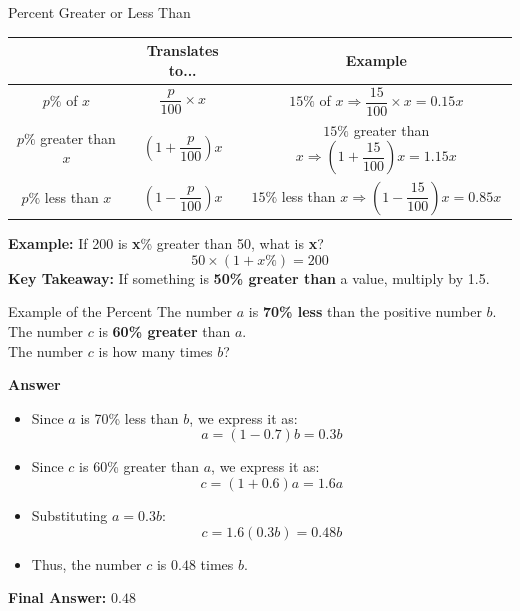 \documentclass{beamer}
\begin{document}
\begin{frame}{Percent Greater or Less Than}

\begin{table}[h]
    \centering
    \scriptsize %
    \renewcommand{\arraystretch}{1}
    \begin{tabular}{|c|c|c|}
        \hline
        & \textbf{Translates to...} & \textbf{Example} \\
        \hline
        $p\%$ of $x$ & $\dfrac{p}{100} \times x$ & $15\%$ of $x \Rightarrow \dfrac{15}{100} \times x = 0.15x$ \\
        \hline
        $p\%$ greater than $x$ & $\left(1 + \dfrac{p}{100} \right)x$ & $15\%$ greater than $x \Rightarrow \left(1 + \dfrac{15}{100} \right)x = 1.15x$ \\
        \hline
        $p\%$ less than $x$ & $\left(1 - \dfrac{p}{100} \right)x$ & $15\%$ less than $x \Rightarrow \left(1 - \dfrac{15}{100} \right)x = 0.85x$ \\
        \hline
    \end{tabular}
\end{table}


    \textbf{Example:} If 200 is \textbf{x}\% greater than 50, what is \textbf{x}?
    \[
   50\times(1+x\%)=200
    \]
    \textbf{Key Takeaway:} If something is \textbf{50\% greater than} a value, multiply by 1.5.
\end{frame}

\begin{frame}{{Example of the Percent}}
    The number \( a \) is \textbf{70\% less} than the positive number \( b \). \\
    The number \( c \) is \textbf{60\% greater} than \( a \). \\
    The number \( c \) is how many times \( b \)?
\end{frame}

\begin{frame}{\textbf{Answer}}
    \begin{itemize}
        \item Since \( a \) is 70\% less than \( b \), we express it as:
        \[
        a = (1 - 0.7)b = 0.3b
        \]
        \item Since \( c \) is 60\% greater than \( a \), we express it as:
        \[
        c = (1 + 0.6)a = 1.6a
        \]
        \item Substituting \( a = 0.3b \):
        \[
        c = 1.6(0.3b) = 0.48b
        \]
        \item Thus, the number \( c \) is \(\mathbf{0.48}\) times \( b \).
    \end{itemize}

    \textbf{Final Answer:} \( \mathbf{0.48} \)
\end{frame}
\end{document}
